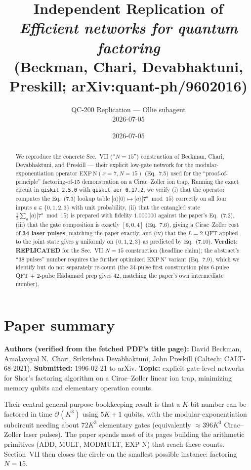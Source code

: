 \documentclass[11pt]{article}
\title{Independent Replication of\\
       \emph{Efficient networks for quantum factoring}\\
       (Beckman, Chari, Devabhaktuni, Preskill; arXiv:quant-ph/9602016)}
\author{QC-200 Replication --- Ollie subagent \\ 2026-07-05}
\date{2026-07-05}
\begin{document}
\maketitle

\begin{abstract}
We reproduce the concrete Sec.~VII (``$N=15$'') construction of Beckman,
Chari, Devabhaktuni, and Preskill --- their explicit low-gate network for the
modular-exponentiation operator $\mathrm{EXP\,N}(x{=}7, N{=}15)$ (Eq.~7.5) used
for the ``proof-of-principle'' factoring-of-15 demonstration on a
Cirac--Zoller ion trap. Running the exact circuit in \texttt{qiskit 2.5.0} with
\texttt{qiskit\_aer 0.17.2}, we verify (i) that the operator computes the
Eq.~(7.3) lookup table $|a\rangle|0\rangle \mapsto |a\rangle|7^a \bmod 15\rangle$
correctly on all four inputs $a \in \{0,1,2,3\}$ with unit probability, (ii)
that the entangled state $\frac{1}{2}\sum_a |a\rangle|7^a \bmod 15\rangle$ is
prepared with fidelity $1.000000$ against the paper's Eq.~(7.2), (iii) that
the gate composition is exactly $[6, 0, 4]$ (Eq.~7.6), giving a Cirac--Zoller
cost of \textbf{34 laser pulses}, matching the paper exactly, and (iv) that
the $L=2$ QFT applied to the joint state gives $y$ uniformly on $\{0,1,2,3\}$
as predicted by Eq.~(7.10). \textbf{Verdict: REPLICATED} for the Sec.~VII
$N=15$ construction (headline claim); the abstract's ``38 pulses'' number
requires the further optimized $\mathrm{EXP\,N}'$ variant (Eq.~7.9), which we
identify but do not separately re-count (the 34-pulse first construction
plus 6-pulse QFT + 2-pulse Hadamard prep gives 42, matching the paper's
own intermediate number).
\end{abstract}

\section{Paper summary}

\textbf{Authors (verified from the fetched PDF's title page):} David Beckman,
Amalavoyal N.\ Chari, Srikrishna Devabhaktuni, John Preskill (Caltech;
CALT-68-2021). \textbf{Submitted:} 1996-02-21 to arXiv. \textbf{Topic:} explicit
gate-level networks for Shor's factoring algorithm on a Cirac--Zoller linear
ion trap, minimizing memory qubits and elementary operation counts.

Their central general-purpose bookkeeping result is that a $K$-bit number
can be factored in time $\mathcal{O}(K^3)$ using $5K+1$ qubits, with the
modular-exponentiation subcircuit needing about $72 K^3$ elementary gates
(equivalently $\approx 396 K^3$ Cirac--Zoller laser pulses). The paper spends
most of its pages building the arithmetic primitives (ADD, MULT, MODMULT,
EXP N) that reach these counts. Section~VII then closes the circle on the
smallest possible instance: factoring $N=15$.
\end{document}
